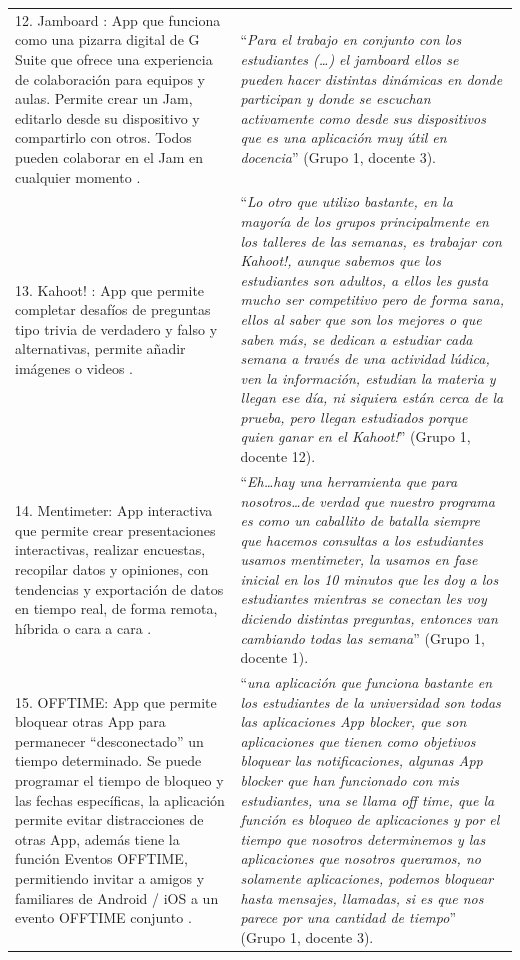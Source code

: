 \documentclass[spanish]{textolivre}
\begin{document}
\begin{longtable}{p{}p{}}
\\
12. Jamboard : App que funciona como una pizarra digital de G Suite que ofrece una experiencia de colaboración para equipos y aulas. Permite crear un Jam, editarlo desde su dispositivo y compartirlo con otros. Todos pueden colaborar en el Jam en cualquier momento \cite{google2021d}. &
“\emph{Para el trabajo en conjunto con los estudiantes (…) el jamboard ellos se pueden hacer distintas dinámicas en donde participan y donde se escuchan activamente como desde sus dispositivos que es una aplicación muy útil en docencia}” (Grupo 1, docente 3).
\\
13. Kahoot! : App que permite completar desafíos de preguntas tipo trivia de verdadero y falso y alternativas, permite añadir imágenes o videos \cite{kahoot_kahoot!_2021}. &
“\emph{Lo otro que utilizo bastante, en la mayoría de los grupos principalmente en los talleres de las semanas, es trabajar con Kahoot!, aunque sabemos que los estudiantes son adultos, a ellos les gusta mucho ser competitivo pero de forma sana, ellos al saber que son los mejores o que saben más, se dedican a estudiar cada semana a través de una actividad lúdica, ven la información, estudian la materia y llegan ese día, ni siquiera están cerca de la prueba, pero llegan estudiados porque quien ganar en el Kahoot!}” (Grupo 1, docente 12).
\\
14. Mentimeter: App interactiva que permite crear presentaciones interactivas, realizar encuestas, recopilar datos y opiniones, con tendencias y exportación de datos en tiempo real, de forma remota, híbrida o cara a cara \cite{mentimeter_mentimeter_nodate}. &
“\emph{Eh…hay una herramienta que para nosotros…de verdad que nuestro programa es como un caballito de batalla siempre que hacemos consultas a los estudiantes usamos mentimeter, la usamos en fase inicial en los 10 minutos que les doy a los estudiantes mientras se conectan les voy diciendo distintas preguntas, entonces van cambiando todas las semana}” (Grupo 1, docente 1).
\\
15. OFFTIME: App que permite bloquear otras App para permanecer “desconectado” un tiempo determinado. Se puede programar el tiempo de bloqueo y las fechas específicas, la aplicación permite evitar distracciones de otras App, además tiene la función Eventos OFFTIME, permitiendo invitar a amigos y familiares de Android / iOS a un evento OFFTIME conjunto \cite{mincubed_offtime_2020}. &
“\emph{una aplicación que funciona bastante en los estudiantes de la universidad son todas las aplicaciones App blocker, que son aplicaciones que tienen como objetivos bloquear las notificaciones, algunas App blocker que han funcionado  con mis estudiantes, una se llama off time, que la función es bloqueo de aplicaciones y por el tiempo que nosotros determinemos y las aplicaciones que nosotros queramos, no solamente aplicaciones, podemos bloquear hasta mensajes, llamadas, si es que nos parece por una cantidad de tiempo}” (Grupo 1, docente 3).

\end{longtable}
\end{document}
